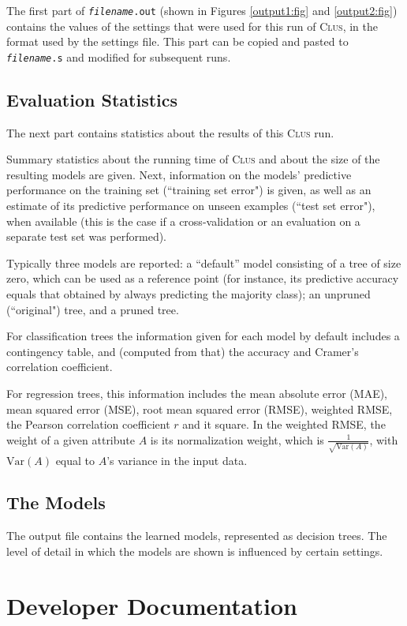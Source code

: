 \documentclass[a4paper]{report}
\newcommand{\clus}{\textsc{Clus}}
\begin{document}
The first part of {\tt {\em filename}.out} (shown in Figures \ref{output1:fig} and \ref{output2:fig}) contains the values of the settings that were used for this run of \clus{}, in the format used by the settings file.  This part can be copied and pasted to {\tt {\em filename}.s} and modified for subsequent runs.

\section{Evaluation Statistics}

The next part contains statistics about the results of this \clus{} run.

Summary statistics about the running time of \clus{} and about the size of the resulting models are given.  Next, information on the models' predictive performance on the training set (``training set error") is given, as well as an estimate of its predictive performance on unseen examples (``test set error"), when available (this is the case if a cross-validation or an evaluation on a separate test set was performed).  

Typically three models are reported: a ``default'' model consisting of a tree of size zero, which can be used as a reference point (for instance, its predictive accuracy equals that obtained by always predicting the majority class); an unpruned (``original") tree, and a pruned tree.

For classification trees the information given for each model by default includes a contingency table, and (computed from that) the accuracy and Cramer's correlation coefficient.

For regression trees, this information includes the mean absolute error (MAE), mean squared error (MSE), root mean squared error (RMSE), weighted RMSE, the Pearson correlation coefficient $r$ and it square.  In the weighted RMSE, the weight of a given attribute $A$ is its normalization weight, which is $\frac{1}{\sqrt{\mathrm{Var}(A)}}$, with $\mathrm{Var}(A)$ equal to $A$'s variance in the input data. 

\section{The Models}

The output file contains the learned models, represented as decision trees.  The level of detail in which the models are shown is influenced by certain settings.

\chapter{Developer Documentation}
\label{ch:devel}
\end{document}
